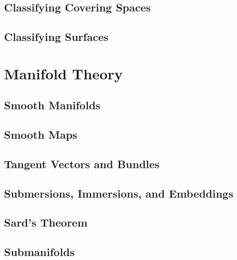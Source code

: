 \documentclass[12pt, a4paper, oneside, openright, titlepage]{book}
\begin{document}
\chapter{\textsection Classifying Covering Spaces}


\chapter{\textsection Classifying Surfaces}


\part{Manifold Theory}


\chapter{\textsection Smooth Manifolds}


\chapter{\textsection Smooth Maps}


\chapter{\textsection Tangent Vectors and Bundles}


\chapter{\textsection Submersions, Immersions, and Embeddings}



\chapter{\textsection Sard's Theorem}




\chapter{\textsection Submanifolds}
\end{document}
